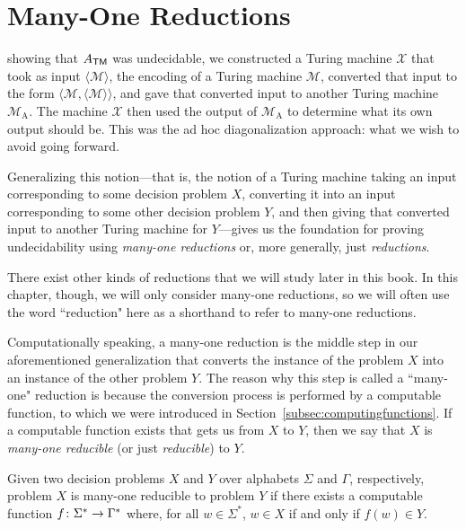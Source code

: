 \section{Many-One Reductions}\label{sec:manyonereductions}

 showing that $A_{\textsf{TM}}$ was undecidable, we constructed a Turing machine $\mathcal{X}$ that took as input $\langle \mathcal{M} \rangle$, the encoding of a Turing machine $\mathcal{M}$, converted that input to the form $\langle \mathcal{M}, \langle \mathcal{M} \rangle \rangle$, and gave that converted input to another Turing machine $\mathcal{M}_{\mathrm{A}}$. The machine $\mathcal{X}$ then used the output of $\mathcal{M}_{\mathrm{A}}$ to determine what its own output should be. This was the ad hoc diagonalization approach: what we wish to avoid going forward.

Generalizing this notion---that is, the notion of a Turing machine taking an input corresponding to some decision problem $X$, converting it into an input corresponding to some other decision problem $Y$, and then giving that converted input to another Turing machine for $Y$---gives us the foundation for proving undecidability using \emph{many-one reductions} or, more generally, just \emph{reductions}.

\begin{remark}
There exist other kinds of reductions that we will study later in this book. In this chapter, though, we will only consider many-one reductions, so we will often use the word ``reduction" here as a shorthand to refer to many-one reductions.
\end{remark}

Computationally speaking, a many-one reduction is the middle step in our aforementioned generalization that converts the instance of the problem $X$ into an instance of the other problem $Y$. The reason why this step is called a ``many-one" reduction is because the conversion process is performed by a computable function, to which we were introduced in Section~\ref{subsec:computingfunctions}. If a computable function exists that gets us from $X$ to $Y$, then we say that $X$ is \emph{many-one reducible} (or just \emph{reducible}) to $Y$.

\begin{definition}\label{def:manyonereduction}
Given two decision problems $X$ and $Y$ over alphabets $\Sigma$ and $\Gamma$, respectively, problem $X$ is many-one reducible to problem $Y$ if there exists a computable function $f \colon \Sigma^{*} \to \Gamma^{*}$ where, for all $w \in \Sigma^{*}$, $w \in X$ if and only if $f(w) \in Y$.
\end{definition}

